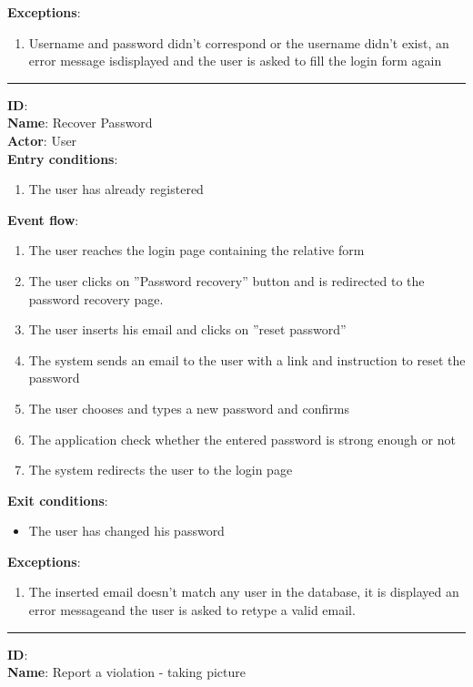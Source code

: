 	\textbf{Exceptions}:
	\begin{enumerate}
    		\item{Username and password didn’t correspond or the username didn’t exist, an error message isdisplayed and the user is asked to ﬁll the login form again}
 	   \end{enumerate}
	\rule{\linewidth}{0.4pt}
	\textbf{ID}:   \\
	\textbf{Name}: Recover Password \\
	\textbf{Actor}: User \\
	\textbf{Entry conditions}:
	\begin{enumerate}
		\item{The user has already registered}
	\end{enumerate}
	\textbf{Event flow}:
	\begin{enumerate}
		\item{The user reaches the login page containing the relative form}
		\item{The user clicks on ”Password recovery” button and is redirected to the password recovery page.}
		\item{The user inserts his email and clicks on ”reset password”}
		\item{The system sends an email to the user with a link and instruction to reset the password}
		\item{The user chooses and types a new password and conﬁrms}
		\item{The application check whether the entered password is strong enough or not}
		\item{The system redirects the user to the login page}
	\end{enumerate}
	\textbf{Exit conditions}:
	\begin{itemize}
		\item{The user has changed his password}
	\end{itemize}
	\textbf{Exceptions}:
	\begin{enumerate}
    		\item{The inserted email doesn't match any user in the database, it is displayed an error messageand the user is asked to retype a valid email.}
 	   \end{enumerate}
	\rule{\linewidth}{0.4pt}
  \textbf{ID}:  \\
  \textbf{Name}: Report a violation - taking picture \\

